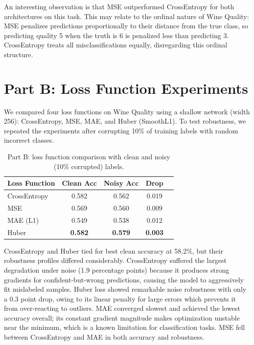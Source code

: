 \documentclass[11pt,a4paper]{article}
\begin{document}
An interesting observation is that MSE outperformed CrossEntropy for both architectures on this task. This may relate to the ordinal nature of Wine Quality: MSE penalizes predictions proportionally to their distance from the true class, so predicting quality 5 when the truth is 6 is penalized less than predicting 3. CrossEntropy treats all misclassifications equally, disregarding this ordinal structure.

\section{Part B: Loss Function Experiments}

We compared four loss functions on Wine Quality using a shallow network (width 256): CrossEntropy, MSE, MAE, and Huber (SmoothL1). To test robustness, we repeated the experiments after corrupting 10\% of training labels with random incorrect classes.

\begin{table}[H]
\centering
\begin{tabular}{lcccc}
\toprule
Loss Function & Clean Acc & Noisy Acc & Drop \\
\midrule
CrossEntropy & 0.582 & 0.562 & 0.019 \\
MSE & 0.569 & 0.560 & 0.009 \\
MAE (L1) & 0.549 & 0.538 & 0.012 \\
Huber & \textbf{0.582} & \textbf{0.579} & \textbf{0.003} \\
\bottomrule
\end{tabular}
\caption{Part B: loss function comparison with clean and noisy (10\% corrupted) labels.}
\end{table}

CrossEntropy and Huber tied for best clean accuracy at 58.2\%, but their robustness profiles differed considerably. CrossEntropy suffered the largest degradation under noise (1.9 percentage points) because it produces strong gradients for confident-but-wrong predictions, causing the model to aggressively fit mislabeled samples. Huber loss showed remarkable noise robustness with only a 0.3 point drop, owing to its linear penalty for large errors which prevents it from over-reacting to outliers. MAE converged slowest and achieved the lowest accuracy overall; its constant gradient magnitude makes optimization unstable near the minimum, which is a known limitation for classification tasks. MSE fell between CrossEntropy and MAE in both accuracy and robustness.
\end{document}
